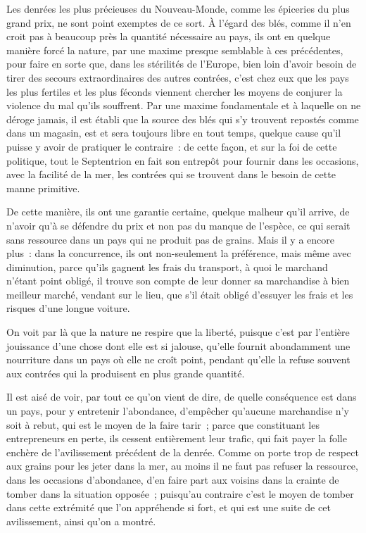\documentclass[french,twoside]{book} %
\begin{document}
Les denrées les plus précieuses du Nouveau-Monde, comme les épiceries du plus grand prix, ne sont point exemptes de ce sort. À l’égard des blés, comme il n’en croit pas à beaucoup près la quantité nécessaire au pays, ils ont en quelque manière forcé la nature, par une maxime presque semblable à ces précédentes, pour faire en sorte que, dans les stérilités de l’Europe, bien loin d’avoir besoin de tirer des secours extraordinaires des autres contrées, c’est chez eux que les pays les plus fertiles et les plus féconds viennent chercher les moyens de conjurer la violence du mal qu’ils souffrent. Par une maxime fondamentale et à laquelle on ne déroge jamais, il est établi que la source des blés qui s’y trouvent repostés comme dans un magasin, est et sera toujours libre en tout temps, quelque cause qu’il puisse y avoir de pratiquer le contraire : de cette façon, et sur la foi de cette politique, tout le Septentrion en fait son entrepôt pour fournir dans les occasions, avec la facilité de la mer, les contrées qui se trouvent dans le besoin de cette manne primitive.\par
De cette manière, ils ont une garantie certaine, quelque malheur qu’il arrive, de n’avoir qu’à se défendre du prix et non pas du manque de l’espèce, ce qui serait sans ressource dans un pays qui ne produit pas de grains. Mais il y a encore plus : dans la concurrence, ils ont non-seulement la préférence, mais même avec diminution, parce qu’ils gagnent les frais du transport, à quoi le marchand n’étant point obligé, il trouve son compte de leur donner sa marchandise à bien meilleur marché, vendant sur le lieu, que s’il était obligé d’essuyer les frais et les risques d’une longue voiture.\par
On voit par là que la nature ne respire que la liberté, puisque c’est par l’entière jouissance d’une chose dont elle est si jalouse, qu’elle fournit abondamment une nourriture dans un pays où elle ne croît point, pendant qu’elle la refuse souvent aux contrées qui la produisent en plus grande quantité.\par
Il est aisé de voir, par tout ce qu’on vient de dire, de quelle conséquence est dans un pays, pour y entretenir l’abondance, d’empêcher qu’aucune marchandise n’y soit à rebut, qui est le moyen de la faire tarir ; parce que constituant les entrepreneurs en perte, ils cessent entièrement leur trafic, qui fait payer la folle enchère de l’avilissement précédent de la denrée. Comme on porte trop de respect aux grains pour les jeter dans la mer, au moins il ne faut pas refuser la ressource, dans les occasions d’abondance, d’en faire part aux voisins dans la crainte de tomber dans la situation opposée ; puisqu’au contraire c’est le moyen de tomber dans cette extrémité que l’on appréhende si fort, et qui est une suite de cet avilissement, ainsi qu’on a montré.
\end{document}
